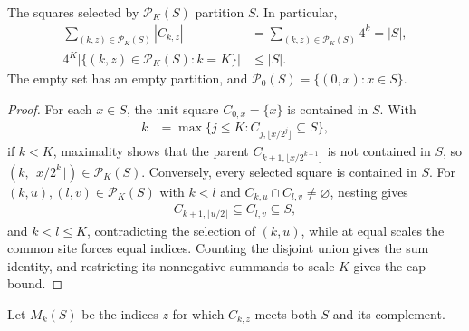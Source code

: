 \begin{lemma}
    \label{thm:area_law_capped_dyadic_partition}
    \leanok
    The squares selected by $\mathcal P_K(S)$ partition $S$. In particular,
    \begin{align}
        \sum_{(k,z)\in\mathcal P_K(S)}|C_{k,z}|
                                                       & =\sum_{(k,z)\in\mathcal P_K(S)}4^k=|S|, \\
        4^K\bigl|\{(k,z)\in\mathcal P_K(S):k=K\}\bigr| & \le |S|.
    \end{align}
    The empty set has an empty partition, and
    $\mathcal P_0(S)=\{(0,x):x\in S\}$.
\end{lemma}
\begin{proof}\leanok
    For each $x\in S$, the unit square $C_{0,x}=\{x\}$ is contained in $S$.
    With
    \begin{align}
        k & =\max\bigl\{j\le K:C_{j,\lfloor x/2^j\rfloor}\subseteq S\bigr\},
    \end{align}
    if $k<K$, maximality shows that the parent
    $C_{k+1,\lfloor x/2^{k+1}\rfloor}$ is not contained in $S$, so
    $(k,\lfloor x/2^k\rfloor)\in\mathcal P_K(S)$. Conversely, every
    selected square is contained in $S$. For $(k,u),(l,v)\in\mathcal P_K(S)$
    with $k<l$ and $C_{k,u}\cap C_{l,v}\neq\varnothing$, nesting gives
    \begin{align}
        C_{k+1,\lfloor u/2\rfloor}\subseteq C_{l,v}\subseteq S,
    \end{align}
    and $k<l\le K$, contradicting the selection of $(k,u)$, while at equal scales the common site forces equal indices.
    Counting the disjoint union gives the sum identity, and restricting its
    nonnegative summands to scale $K$ gives the cap bound.
\end{proof}

\begin{definition}
    \label{def:area_law_mixed_dyadic_square}
    \leanok
    Let $M_k(S)$ be the indices $z$ for which $C_{k,z}$ meets both $S$
    and its complement.
\end{definition}


